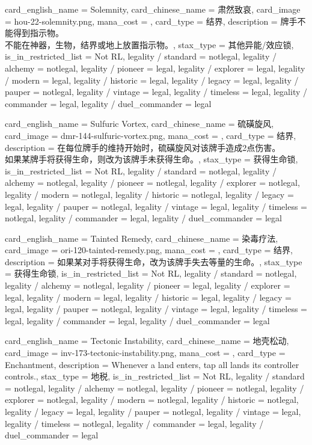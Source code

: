 \documentclass[lang = cn, color = black, 10pt]{AllThatStax}
\begin{document}
\card
{
	card_english_name = {Solemnity},
	card_chinese_name = {肃然致哀},
	card_image = hou-22-solemnity.png,
	mana_cost = ,
	card_type = 结界,
	description = {牌手不能得到指示物。\\
		不能在神器，生物，结界或地上放置指示物。},
	stax_type = 其他异能/效应锁,
	is_in_restricted_list = Not RL,
	legality / standard = notlegal,
	legality / alchemy = notlegal,
	legality / pioneer = legal,
	legality / explorer = legal,
	legality / modern = legal,
	legality / historic = legal,
	legality / legacy = legal,
	legality / pauper = notlegal,
	legality / vintage = legal,
	legality / timeless = legal,
	legality / commander = legal,
	legality / duel_commander = legal
}

\card
{
	card_english_name = {Sulfuric Vortex},
	card_chinese_name = {硫磺旋风},
	card_image = dmr-144-sulfuric-vortex.png,
	mana_cost = ,
	card_type = 结界,
	description = {在每位牌手的维持开始时，硫磺旋风对该牌手造成2点伤害。\\
		如果某牌手将获得生命，则改为该牌手未获得生命。},
	stax_type = 获得生命锁,
	is_in_restricted_list = Not RL,
	legality / standard = notlegal,
	legality / alchemy = notlegal,
	legality / pioneer = notlegal,
	legality / explorer = notlegal,
	legality / modern = notlegal,
	legality / historic = notlegal,
	legality / legacy = legal,
	legality / pauper = notlegal,
	legality / vintage = legal,
	legality / timeless = notlegal,
	legality / commander = legal,
	legality / duel_commander = legal
}

\card
{
	card_english_name = {Tainted Remedy},
	card_chinese_name = {染毒疗法},
	card_image = ori-120-tainted-remedy.png,
	mana_cost = ,
	card_type = 结界,
	description = {如果某对手将获得生命，改为该牌手失去等量的生命。},
	stax_type = 获得生命锁,
	is_in_restricted_list = Not RL,
	legality / standard = notlegal,
	legality / alchemy = notlegal,
	legality / pioneer = legal,
	legality / explorer = legal,
	legality / modern = legal,
	legality / historic = legal,
	legality / legacy = legal,
	legality / pauper = notlegal,
	legality / vintage = legal,
	legality / timeless = legal,
	legality / commander = legal,
	legality / duel_commander = legal
}

\card
{
	card_english_name = {Tectonic Instability},
	card_chinese_name = {地壳松动},
	card_image = inv-173-tectonic-instability.png,
	mana_cost = ,
	card_type = Enchantment,
	description = {Whenever a land enters, tap all lands its controller controls.},
	stax_type = 地税,
	is_in_restricted_list = Not RL,
	legality / standard = notlegal,
	legality / alchemy = notlegal,
	legality / pioneer = notlegal,
	legality / explorer = notlegal,
	legality / modern = notlegal,
	legality / historic = notlegal,
	legality / legacy = legal,
	legality / pauper = notlegal,
	legality / vintage = legal,
	legality / timeless = notlegal,
	legality / commander = legal,
	legality / duel_commander = legal
}
\end{document}
